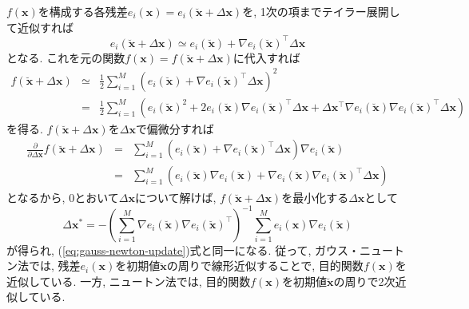 \documentclass[dvipdfmx,a4paper]{jsarticle}
\begin{document}
$f(\bm{x})$を構成する各残差$e_i(\bm{x}) = e_i(\breve{\bm{x}} + \Delta \bm{x})$を, 1次の項までテイラー展開して近似すれば
\begin{equation}
    e_i(\breve{\bm{x}} + \Delta \bm{x})
    \simeq e_i(\breve{\bm{x}}) + \nabla e_i(\breve{\bm{x}})^\top \Delta \bm{x}
    \label{eq:gauss-newton-residual-approx}
\end{equation}
となる. これを元の関数$f(\bm{x}) = f(\breve{\bm{x}} + \Delta \bm{x})$に代入すれば
\begin{eqnarray}
    f(\breve{\bm{x}} + \Delta \bm{x})
    &\simeq& \frac{1}{2} \sum_{i = 1}^M
    \left( e_i(\breve{\bm{x}})
    + \nabla e_i(\breve{\bm{x}})^\top \Delta \bm{x} \right)^2
    \label{eq:gauss-newton-function-approx} \\
    &=& \frac{1}{2} \sum_{i = 1}^M
    \left( e_i(\breve{\bm{x}})^2
    + 2 e_i(\breve{\bm{x}}) \nabla e_i(\breve{\bm{x}})^\top \Delta \bm{x}
    + \Delta \bm{x}^\top \nabla e_i(\breve{\bm{x}})
    \nabla e_i(\breve{\bm{x}})^\top \Delta \bm{x} \right)
\end{eqnarray}
を得る. $f(\breve{\bm{x}} + \Delta \bm{x})$を$\Delta \bm{x}$で偏微分すれば
\begin{eqnarray}
    \frac{\partial}{\partial \Delta \bm{x}} f(\breve{\bm{x}} + \Delta \bm{x})
    &=& \sum_{i = 1}^M \left( e_i(\breve{\bm{x}})
    + \nabla e_i(\breve{\bm{x}})^\top \Delta \bm{x} \right) \nabla e_i(\breve{\bm{x}}) \\
    &=& \sum_{i = 1}^M \left( e_i(\breve{\bm{x}}) \nabla e_i(\breve{\bm{x}})
    + \nabla e_i(\breve{\bm{x}}) \nabla e_i(\breve{\bm{x}})^\top \Delta \bm{x} \right)
\end{eqnarray}
となるから, $0$とおいて$\Delta \bm{x}$について解けば, $f(\breve{\bm{x}} + \Delta \bm{x})$を最小化する$\Delta \bm{x}$として
\begin{equation}
    \Delta \bm{x}^* = -\left( \sum_{i = 1}^M \nabla e_i(\breve{\bm{x}})
    \nabla e_i(\breve{\bm{x}})^\top \right)^{-1}
    \sum_{i = 1}^M e_i(\bm{x}) \nabla e_i(\breve{\bm{x}})
\end{equation}
が得られ, (\ref{eq:gauss-newton-update})式と同一になる.
従って, ガウス・ニュートン法では, 残差$e_i(\bm{x})$を初期値$\breve{\bm{x}}$の周りで線形近似することで, 目的関数$f(\bm{x})$を近似している.
一方, ニュートン法では, 目的関数$f(\bm{x})$を初期値$\breve{\bm{x}}$の周りで2次近似している.
\end{document}
